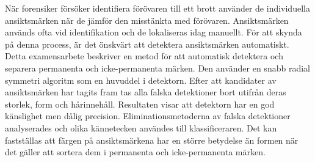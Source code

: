 När forensiker försöker identifiera förövaren till ett brott använder de individuella ansiktsmärken när de jämför den misstänkta med förövaren. Ansiktsmärken används ofta vid identifikation och de lokaliseras idag manuellt. För att skynda på denna process, är det önskvärt att detektera ansiktsmärken automatiskt. Detta examensarbete beskriver en metod för att automatisk detektera och separera permanenta och icke-permanenta märken. Den använder en snabb radial symmetri algoritm som en huvuddel i detektorn. Efter att kandidater av ansiktsmärken har tagits fram tas alla falska detektioner bort utifrån deras storlek, form och hårinnehåll. Resultaten visar att detektorn har en god känslighet men dålig precision. Eliminationsmetoderna av falska detektioner analyserades och olika kännetecken användes till klassificeraren. Det kan fastställas att färgen på ansiktsmärkena har en större betydelse än formen när det gäller att sortera dem i permanenta och icke-permanenta märken.